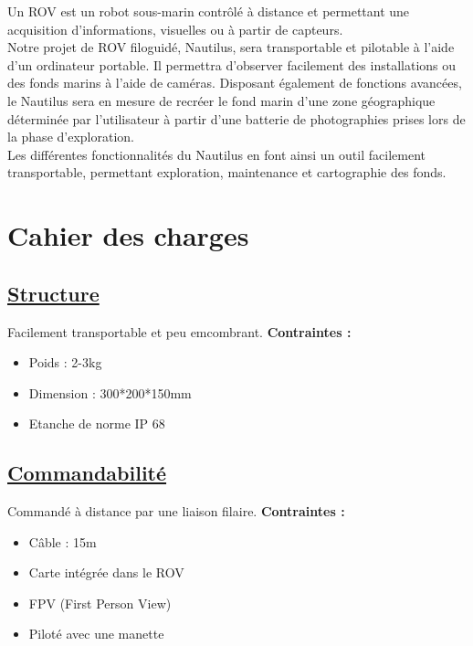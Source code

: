 \documentclass[a4paper,11pt]{report}
\begin{document}
				Un ROV est un robot sous-marin contrôlé à distance et permettant une acquisition d'informations, visuelles ou à partir de capteurs.
\\Notre projet de ROV filoguidé, Nautilus, sera transportable et pilotable à l'aide d'un ordinateur portable. Il permettra d'observer facilement des installations ou des fonds marins à l'aide de caméras. Disposant également de fonctions avancées, le Nautilus sera en mesure de recréer le fond marin d'une zone géographique déterminée par l'utilisateur à partir d'une batterie de photographies prises lors de la phase d'exploration.
\\Les différentes fonctionnalités du Nautilus en font ainsi un outil facilement transportable, permettant exploration, maintenance et cartographie des fonds.
\newpage
				
				
\section*{\Huge Cahier des charges \newline}

						\subsection*{\underline{Structure}}
								Facilement transportable et peu emcombrant.\newline
								\textbf{Contraintes :}
								\begin{itemize}
										\item Poids : 2-3kg
										\item Dimension : 300*200*150mm
										\item Etanche de norme IP 68 \newline
									\end{itemize}

						\subsection*{\underline{Commandabilité}}
								Commandé à distance par une liaison filaire.\newline
								\textbf{Contraintes :}
								\begin{itemize}
										\item Câble : 15m
										\item Carte intégrée dans le ROV
										\item FPV (First Person View)
										\item Piloté avec une manette \newline
								\end{itemize}
\end{document}
